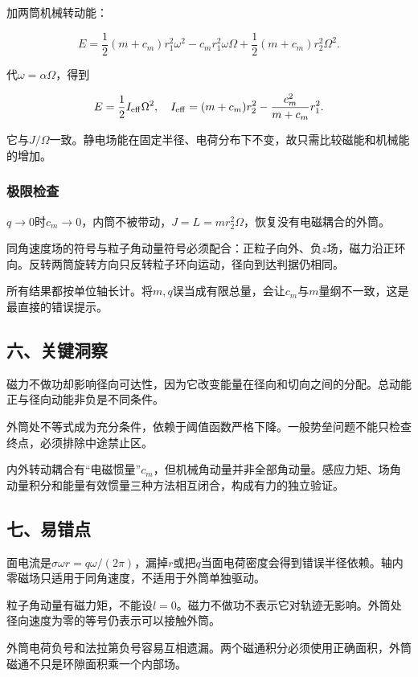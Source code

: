\documentclass[12pt,a4paper,fontset=fandol]{ctexart}
\begin{document}
加两筒机械转动能：

\[
E=\frac12(m+c_m)r_1^2\omega^2
-c_mr_1^2\omega\Omega
+\frac12(m+c_m)r_2^2\Omega^2.
\]

代\(\omega=\alpha\Omega\)，得到

\[
E=\frac12I_{\rm eff}\Omega^2,\quad
I_{\rm eff}=(m+c_m)r_2^2-\frac{c_m^2}{m+c_m}r_1^2.
\]

它与\(J/\Omega\)一致。静电场能在固定半径、电荷分布下不变，故只需比较磁能和机械能的增加。

\subsubsection{极限检查}\label{ux6781ux9650ux68c0ux67e5}

\(q\to0\)时\(c_m\to0\)，内筒不被带动，\(J=L=m r_2^2\Omega\)，恢复没有电磁耦合的外筒。

同角速度场的符号与粒子角动量符号必须配合：正粒子向外、负\(z\)场，磁力沿正环向。反转两筒旋转方向只反转粒子环向运动，径向到达判据仍相同。

所有结果都按单位轴长计。将\(m,q\)误当成有限总量，会让\(c_m\)与\(m\)量纲不一致，这是最直接的错误提示。

\subsection{六、关键洞察}\label{ux516dux5173ux952eux6d1eux5bdf-5}

磁力不做功却影响径向可达性，因为它改变能量在径向和切向之间的分配。总动能正与径向动能非负是不同条件。

外筒处不等式成为充分条件，依赖于阈值函数严格下降。一般势垒问题不能只检查终点，必须排除中途禁止区。

内外转动耦合有``电磁惯量''\(c_m\)，但机械角动量并非全部角动量。感应力矩、场角动量积分和能量有效惯量三种方法相互闭合，构成有力的独立验证。

\subsection{七、易错点}\label{ux4e03ux6613ux9519ux70b9-5}

面电流是\(\sigma\omega r=q\omega/(2\pi)\)，漏掉\(r\)或把\(q\)当面电荷密度会得到错误半径依赖。轴内零磁场只适用于同角速度，不适用于外筒单独驱动。

粒子角动量有磁力矩，不能设\(l=0\)。磁力不做功不表示它对轨迹无影响。外筒处径向速度为零的等号仍表示可以接触外筒。

外筒电荷负号和法拉第负号容易互相遗漏。两个磁通积分必须使用正确面积，外筒磁通不只是环隙面积乘一个内部场。
\end{document}

